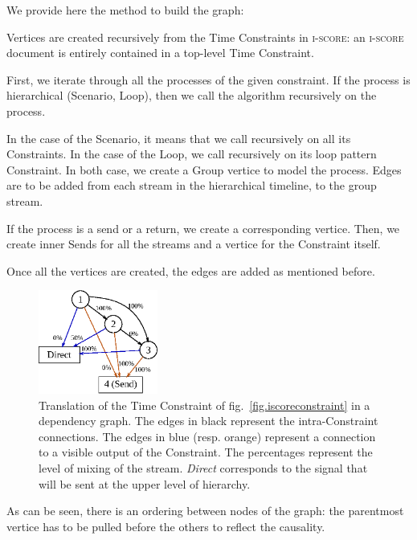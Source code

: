 \documentclass{article}
\newcommand*{\iscore}{\textsc{i-score}\xspace}
\begin{document}
We provide here the method to build the graph:

Vertices are created recursively from the Time Constraints in \iscore: an \iscore document is entirely contained in a top-level Time Constraint.

First, we iterate through all the processes of the given constraint.
If the process is hierarchical (Scenario, Loop), then we call the algorithm recursively on the process.

In the case of the Scenario, it means that we call recursively on all its Constraints.
In the case of the Loop, we call recursively on its loop pattern Constraint.
In both case, we create a Group vertice to model the process. 
Edges are to be added from each stream in the hierarchical timeline, to the group stream.

If the process is a send or a return, we create a corresponding vertice.
Then, we create inner Sends for all the streams and a vertice for the Constraint itself.

Once all the vertices are created, the edges are added as mentioned before.

\begin{figure}
	\centering
	\includegraphics[width=0.35\textwidth]{figures/graph1.eps}
	\caption{Translation of the Time Constraint of fig.~\ref{fig.iscoreconstraint} in a dependency graph.
		The edges in black represent the intra-Constraint connections. 
		The edges in blue (resp. orange) represent a connection to a visible output of 
		the Constraint. The percentages represent the level of mixing of the stream.
		\textit{Direct} corresponds to the signal that will be sent at the upper level of hierarchy.}
	\label{fig.graph}
\end{figure}

As can be seen, there is an ordering between nodes of the graph: the parentmost vertice
has to be pulled before the others to reflect the causality.
\end{document}

